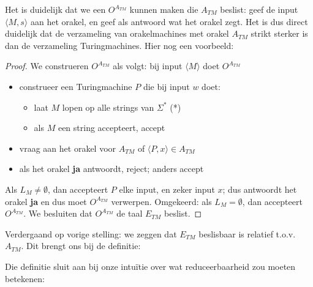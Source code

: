 Het is duidelijk dat we een $O^{A_{TM}}$ kunnen maken die $A_{TM}$
beslist: geef de input $\langle M,s \rangle$ aan het orakel, en geef als antwoord
wat het orakel zegt. Het is dus direct duidelijk dat de verzameling
van orakelmachines met orakel $A_{TM}$ strikt sterker is dan de
verzameling Turingmachines. Hier nog een voorbeeld:


\begin{proof}
We construeren $O^{A_{TM}}$ als volgt: bij input $\langle M \rangle$ doet $O^{A_{TM}}$
\begin{itemize}
\item 
construeer een Turingmachine $P$ die bij input $w$ doet:
\begin{itemize}
\item laat $M$ lopen op alle strings van $\Sigma^*$ (*)\label{allestrings}
\item als $M$ een string accepteert, accept
\end{itemize}

\item vraag aan het orakel voor $A_{TM}$ of $\langle P,x \rangle \in A_{TM}$

\item als het orakel {\bf ja} antwoordt, reject; anders accept
\end{itemize}
Als $L_M \neq \emptyset$, dan accepteert $P$ elke input, en zeker
input $x$; dus antwoordt het orakel {\bf ja} en dus moet $O^{A_{TM}}$
verwerpen. Omgekeerd: als $L_M = \emptyset$,
dan accepteert
$O^{A_{TM}}$. We besluiten dat $O^{A_{TM}}$ de taal $E_{TM}$ beslist.
\end{proof}


Verdergaand op vorige stelling: we zeggen dat $E_{TM}$ beslisbaar is
relatief t.o.v. $A_{TM}$. Dit brengt ons bij de definitie:


Die definitie sluit aan bij onze intu\"{i}tie over wat reduceerbaarheid
zou moeten betekenen:



